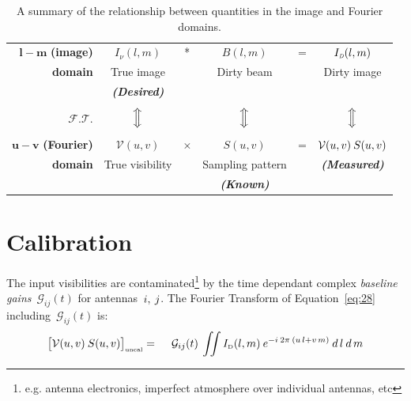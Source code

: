 \documentclass[11pt, a4paper]{article}
\newcommand{\msp}{\mkern \medmuskip}
\begin{document}
\begin{table}
  \centering
  \begin{tabular}{r|ccccc}
$\mathbf{l-m}$ \textbf{(image)}     & $I_\nu (l, m)$            & * & $B(l, m)$               & = & $I_{\mbox{\tiny{\emph{D}}}}(l, m)$ \\
\textbf{domain}                     & True image               & & Dirty beam              &   & Dirty image                       \\
                                    & \emph{\textbf{(Desired)}}& & & & \\
                                    &                          & & & & \\
              $\mathcal{F.T.}$      & $\Big \Updownarrow $     & & $\Big \Updownarrow $    &   & $\Big \Updownarrow $              \\
                                    &                          & & & & \\
$\mathbf{u-v}$ \textbf{(Fourier)}   & $\mathcal{V}(u,  v)$     & $\times $ & $S(u, v)$               & = & $\mathcal{V}(u,  v) \msp S(u, v)$ \\
      \textbf{domain}               & True visibility          & & Sampling pattern        &   & \emph{\textbf{(Measured)}}        \\
                                    &                          & & \emph{\textbf{(Known)}} &   &                                   \\
  \end{tabular}
  \caption[]{A summary of the relationship between quantities in the image and Fourier domains.}
  \label{tab:uv-summary}
\end{table}

\section{Calibration}
\label{sec:calibration}

The input visibilities are contaminated\footnote{e.g. antenna electronics, imperfect atmosphere over individual antennas, etc} by the time dependant complex \emph{baseline gains}~$\mathcal{G}_{ij}(t)$ for antennas~$i,\msp j$. The Fourier Transform of Equation~\eqref{eq:28} including~$\mathcal{G}_{ij}(t)$ is:
\begin{eqnarray}
  \label{eq:32}
  \big [\mathcal{V}(u,  v) \msp S(u, v)\big ]_{\mbox{\tiny uncal}} &=& \enspace \mathcal{G}_{ij}(t) \msp \iint I_{\mbox{\tiny D}} (l, m) \msp e^{-i \msp 2\pi \msp (u\,l + v\,m)} \msp d\,l \msp d\,m \nonumber \\
\end{eqnarray}
\end{document}
